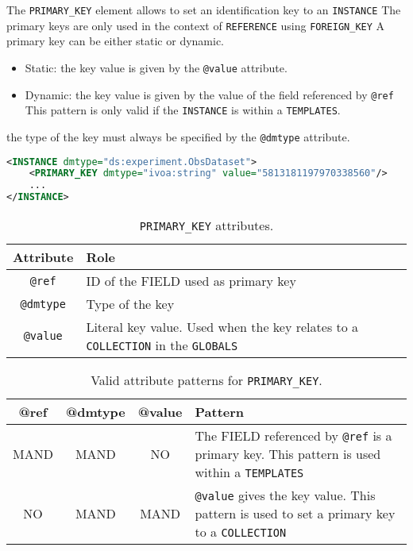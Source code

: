 The \texttt{PRIMARY\_KEY} element allows to set an identification key to an \texttt{INSTANCE}  The primary keys are only used in the context of \texttt{REFERENCE}  using \texttt{FOREIGN\_KEY} 
A primary key can be either static or dynamic.

\begin{itemize}
    \item Static: the key value is given by the \texttt{@value} attribute.
    \item Dynamic: the key value is given by the value of the field referenced by \texttt{@ref}  
    This pattern is only valid if the \texttt{INSTANCE} is within a \texttt{TEMPLATES}. 
\end{itemize}

the type of the key must always be specified by the \texttt{@dmtype} attribute. 

\begin{lstlisting}[caption={The \texttt{INSTANCE} is identified within a \texttt{COLLECTION} with the \texttt{PRIMAR\_KEY} value (see \ref{PRIMARY_KEY_snippet}).},language=XML]
<INSTANCE dmtype="ds:experiment.ObsDataset">
    <PRIMARY_KEY dmtype="ivoa:string" value="5813181197970338560"/>
    ...
</INSTANCE>
\end{lstlisting}

\begin{table}[!htbp]
\small
\centering
\begin{tabulary}{\linewidth}{|c|J|}       
       \hline 
            \textbf{Attribute} & 
            \textbf {Role}\\
       \hline         \hline  
            \texttt{@ref} &
            ID of the FIELD used as primary key \\
        \hline 
            \texttt{@dmtype} & 
            Type of the key \\
        \hline 
            \texttt{@value} & 
            Literal key value. Used when the key relates to a \texttt{COLLECTION} in the \texttt{GLOBALS} \\
        \hline 
     \end{tabulary}
     \caption{\texttt{PRIMARY\_KEY} attributes.} 
     \label{tbl:primarykey-att}
 \end{table}

\begin{table}[!htbp]
\small
\centering
\begin{tabulary}{\linewidth}{|c|c|c|J|}
    \hline 
        \textbf{@ref} &
        \textbf{@dmtype} &
        \textbf{@value} &
        \textbf{Pattern}\\
    \hline      \hline  
        MAND &           
        MAND &           
        NO &           
        The FIELD referenced by \texttt{@ref} is a primary key. This pattern is used within a \texttt{TEMPLATES} \\
    \hline     
        NO &           
        MAND &           
        MAND &           
        \texttt{@value} gives the key value. This pattern is used to set a primary key to a \texttt{COLLECTION}\\
   \hline 
\end{tabulary}
     \caption{Valid attribute patterns for  \texttt{PRIMARY\_KEY}.}
     \label{tbl:primarykey-pattern}
\end{table}
